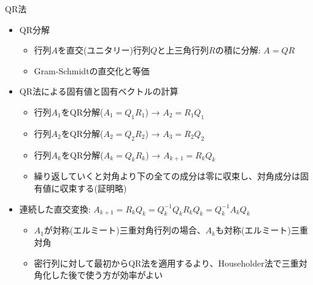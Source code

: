 \begin{frame}[t,fragile]{QR法}
  \begin{itemize}
  \item QR分解
    \begin{itemize}
    \item 行列$A$を直交(ユニタリー)行列$Q$と上三角行列$R$の積に分解: $A=QR$
    \item Gram-Schmidtの直交化と等価
    \end{itemize}
  \item QR法による固有値と固有ベクトルの計算
    \begin{itemize}
    \item 行列$A_1$をQR分解($A_1=Q_1R_1$) → $A_2 = R_1Q_1$ 
    \item 行列$A_2$をQR分解($A_2=Q_2R_2$) → $A_3 = R_2Q_2$ 
    \item 行列$A_k$をQR分解($A_k=Q_kR_k$) → $A_{k+1} = R_kQ_k$
    \item 繰り返していくと対角より下の全ての成分は零に収束し、対角成分は固有値に収束する(証明略)
    \end{itemize}
  \item 連続した直交変換: $A_{k+1} = R_kQ_k = Q_k^{-1}Q_kR_kQ_k = Q_k^{-1}A_kQ_k$
    \begin{itemize}
    \item $A_1$が対称(エルミート)三重対角行列の場合、$A_k$も対称(エルミート)三重対角
    \item 密行列に対して最初からQR法を適用するより、Householder法で三重対角化した後で使う方が効率がよい
    \end{itemize}
  \end{itemize}
\end{frame}
